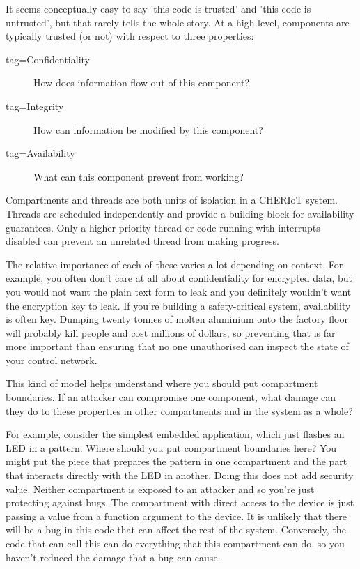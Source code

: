 It seems conceptually easy to say 'this code is trusted' and 'this code is untrusted', but that rarely tells the whole story.
At a high level, components are typically trusted (or not) with respect to three properties:

\begin{description}
	\item[tag=Confidentiality]{How does information flow out of this component?}
	\item[tag=Integrity]{How can information be modified by this component?}
	\item[tag=Availability]{What can this component prevent from working?}
\end{description}

\begin{note}
Compartments and threads are both units of isolation in a CHERIoT system.
Threads are scheduled independently and provide a building block for availability guarantees.
Only a higher-priority thread or code running with interrupts disabled can prevent an unrelated thread from making progress.
\end{note}

The relative importance of each of these varies a lot depending on context.
For example, you often don't care at all about confidentiality for encrypted data, but you would not want the plain text form to leak and you definitely wouldn't want the encryption key to leak.
If you're building a safety-critical system, availability is often key.
Dumping twenty tonnes of molten aluminium onto the factory floor will probably kill people and cost millions of dollars, so preventing that is far more important than ensuring that no one unauthorised can inspect the state of your control network.

This kind of model helps understand where you should put compartment boundaries.
If an attacker can compromise one component, what damage can they do to these properties in other compartments and in the system as a whole?

For example, consider the simplest embedded application, which just flashes an LED in a pattern.
Where should you put compartment boundaries here?
You might put the piece that prepares the pattern in one compartment and the part that interacts directly with the LED in another.
Doing this does not add security value.
Neither compartment is exposed to an attacker and so you're just protecting against bugs.
The compartment with direct access to the device is just passing a value from a function argument to the device.
It is unlikely that there will be a bug in this code that can affect the rest of the system.
Conversely, the code that can call this can do everything that this compartment can do, so you haven't reduced the damage that a bug can cause.

